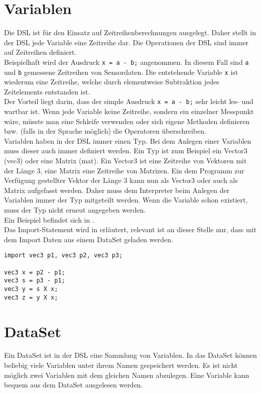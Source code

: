 \section{Variablen}
Die \ac{DSL} ist für den Einsatz auf Zeitreihenberechnungen ausgelegt.
Daher stellt in der \ac{DSL} jede Variable eine Zeitreihe dar.
Die Operationen der \ac{DSL} sind immer auf Zeitreihen definiert.\\
Beispielhaft wird der Ausdruck \texttt{x = a - b;} angenommen.
In diesem Fall sind \texttt{a} und \texttt{b} gemessene Zeitreihen von Sensordaten.
Die entstehende Variable \texttt{x} ist wiederum eine Zeitreihe, welche durch elementweise Subtraktion jedes Zeitelements entstanden ist.\\
Der Vorteil liegt darin, dass der simple Ausdruck \texttt{x = a - b;} sehr leicht les- und wartbar ist.
Wenn jede Variable keine Zeitreihe, sondern ein einzelner Messpunkt wäre, müsste man eine Schleife verwenden oder sich eigene Methoden definieren bzw. (falls in der Sprache möglich) die Operatoren überschreiben.\\
Variablen haben in der \ac{DSL} immer einen Typ.
Bei dem Anlegen einer Variablen muss dieser auch immer definiert werden.
Ein Typ ist zum Beispiel ein Vector3 (vec3) oder eine Matrix (mat).
Ein Vector3 ist eine Zeitreihe von Vektoren mit der Länge 3, eine Matrix eine Zeitreihe von Matrizen.
Ein dem Programm zur Verfügung gestellter Vektor der Länge 3 kann nun als Vector3 oder auch als Matrix aufgefasst werden.
Daher muss dem Interpreter beim Anlegen der Variablen immer der Typ mitgeteilt werden.
Wenn die Variable schon existiert, muss der Typ nicht erneut angegeben werden.\\
Ein Beispiel befindet sich in .\\
Das Import-Statement wird in  erläutert, relevant ist an dieser Stelle nur, dass mit dem Import Daten aus einem DataSet geladen werden.

\begin{lstlisting}[language=prepro, label={lst:Bsp_Variablenzuweisung}, caption={Beispiel Variablenzuweisung}, captionpos=b]
import vec3 p1, vec3 p2, vec3 p3;

vec3 x = p2 - p1;
vec3 s = p3 - p1;
vec3 y = s X x;
vec3 z = y X x;
\end{lstlisting}

\section{DataSet}
Ein DataSet ist in der \ac{DSL} eine Sammlung von Variablen.
In das DataSet können beliebig viele Variablen unter ihrem Namen gespeichert werden.
Es ist nicht möglich zwei Variablen mit dem gleichen Namen abzulegen.
Eine Variable kann bequem aus dem DataSet ausgelesen werden.

